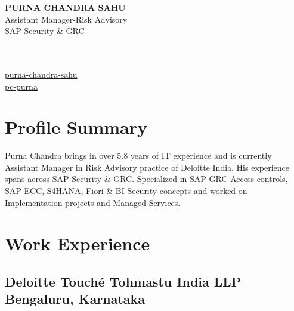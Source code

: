 \documentclass[10pt]{article}
\begin{document}
\begin{center}
	\begin{minipage}{0.5\textwidth}
		{\bfseries \Large
			PURNA CHANDRA SAHU %
		} \\ 
		Assistant Manager-Risk Advisory \\ %
		SAP Security \& GRC

	\end{minipage} \hfill
	\begin{minipage}{0.3\textwidth}
		\footnotesize \raggedright
			\\
			 \\
			 \href {linkedin.com/in/purna-chandra-sahu}{purna-chandra-sahu} \\
			  \href {github.com/pc-purna}{pc-purna} \\
	\end{minipage}
\end{center}

\section{Profile Summary}
\begin{minipage}{1.0\textwidth}
	
	\small 
	{
		Purna Chandra brings in over 5.8 years of IT experience and is currently Assistant Manager 
	in Risk Advisory practice of Deloitte India. His experience spans across SAP Security \& GRC. 
	Specialized in SAP GRC Access controls, SAP ECC, S4HANA, Fiori \& BI Security concepts and 
	worked on Implementation projects and Managed Services.
	}
\end{minipage}



\section{Work Experience}
\subsection{Deloitte Touché Tohmastu India LLP \hfill \normalfont Bengaluru, Karnataka}
\end{document}

